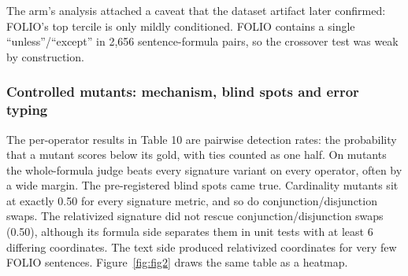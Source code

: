 \documentclass[11pt,letterpaper]{article}
\begin{document}
The arm's analysis attached a caveat that the dataset artifact later confirmed: FOLIO's top tercile is only mildly conditioned. FOLIO contains a single ``unless''/``except'' in 2,656 sentence-formula pairs, so the crossover test was weak by construction.

\subsubsection{Controlled mutants: mechanism, blind spots and error typing}

The per-operator results in Table 10 are pairwise detection rates: the probability that a mutant scores below its gold, with ties counted as one half. On mutants the whole-formula judge beats every signature variant on every operator, often by a wide margin. The pre-registered blind spots came true. Cardinality mutants sit at exactly 0.50 for every signature metric, and so do conjunction/disjunction swaps. The relativized signature did not rescue conjunction/disjunction swaps (0.50), although its formula side separates them in unit tests with at least 6 differing coordinates. The text side produced relativized coordinates for very few FOLIO sentences. Figure~\ref{fig:fig2} draws the same table as a heatmap.
\end{document}
